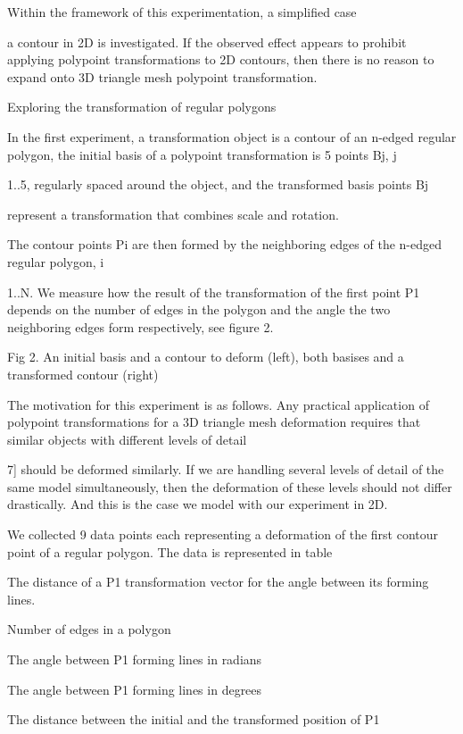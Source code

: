 \documentclass[12pt,a4paper]{article}
\begin{document}
\par
Within the framework of this experimentation, a simplified case
\par
a contour in 2D is investigated. If the observed effect appears to prohibit applying polypoint transformations to 2D contours, then there is no reason to expand onto 3D triangle mesh polypoint transformation.
\par
Exploring the transformation of regular polygons
\par
In the first experiment, a transformation object is a contour of an n-edged regular polygon, the initial basis of a polypoint transformation is 5 points Bj, j
\par
1..5, regularly spaced around the object, and the transformed basis points Bj
\par
represent a transformation that combines scale and rotation.
\par
The contour points Pi are then formed by the neighboring edges of the n-edged regular polygon, i
\par
1..N. We measure how the result of the transformation of the first point P1 depends on the number of edges in the polygon and the angle the two neighboring edges form respectively, see figure 2.
\par
Fig 2. An initial basis and a contour to deform (left), both basises and a transformed contour (right)
\par
The motivation for this experiment is as follows. Any practical application of polypoint transformations for a 3D triangle mesh deformation requires that similar objects with different levels of detail
\par
7] should be deformed similarly. If we are handling several levels of detail of the same model simultaneously, then the deformation of these levels should not differ drastically. And this is the case we model with our experiment in 2D.
\par
We collected 9 data points each representing a deformation of the first contour point of a regular polygon. The data is represented in table
\par
The distance of a P1 transformation vector for the angle between its forming lines.
\par
Number of edges in a polygon
\par
The angle between P1 forming lines in radians
\par
The angle between P1 forming lines in degrees
\par
The distance between the initial and the transformed position of P1
\end{document}
